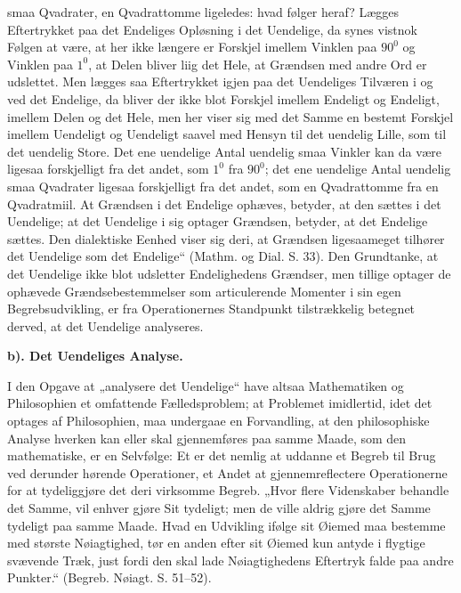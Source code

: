 \documentclass[12pt,a4paper]{book}
\begin{document}
smaa Qvadrater, en Qvadrattomme ligeledes: hvad følger
heraf? Lægges Eftertrykket paa det Endeliges Opløsning i
det Uendelige, da synes vistnok Følgen at være, at her ikke
længere er Forskjel imellem Vinklen paa $90^{0}$ og Vinklen paa
$1^{0}$, at Delen bliver liig det Hele, at Grændsen med andre
Ord er udslettet. Men lægges saa Eftertrykket igjen paa
det Uendeliges Tilværen i og ved det Endelige, da bliver
der ikke blot Forskjel imellem Endeligt og Endeligt, imellem
Delen og det Hele, men her viser sig med det Samme en
bestemt Forskjel imellem Uendeligt og Uendeligt saavel med
Hensyn til det uendelig Lille, som til det uendelig Store.
Det ene uendelige Antal uendelig smaa Vinkler kan da være
ligesaa forskjelligt fra det andet, som $1^{0}$ fra $90^{0}$; det ene
uendelige Antal uendelig smaa Qvadrater ligesaa forskjelligt
fra det andet, som en Qvadrattomme fra en Qvadratmiil.
At Grændsen i det Endelige ophæves, betyder, at den sættes
i det Uendelige; at det Uendelige i sig optager Grændsen,
betyder, at det Endelige sættes. Den dialektiske Eenhed viser
sig deri, at Grændsen ligesaameget tilhører det Uendelige som
det Endelige“ (Mathm. og Dial. S. 33). Den Grundtanke,
at det Uendelige ikke blot udsletter Endelighedens Grændser,
men tillige optager de ophævede Grændsebestemmelser som
articulerende Momenter i sin egen Begrebsudvikling, er fra
Operationernes Standpunkt tilstrækkelig betegnet derved, at
det Uendelige analyseres.

\textbf{b). Det Uendeliges Analyse.}

I den Opgave at „analysere det Uendelige“ have altsaa
Mathematiken og Philosophien et omfattende Fælledsproblem;
at Problemet imidlertid, idet det optages af Philosophien,
maa undergaae en Forvandling, at den philosophiske Analyse
hverken kan eller skal gjennemføres paa samme Maade, som
den mathematiske, er en Selvfølge: Et er det nemlig at uddanne
et Begreb til Brug ved derunder hørende Operationer,
et Andet at gjennemreflectere Operationerne for at tydeliggjøre
det deri virksomme Begreb. „Hvor flere Videnskaber
behandle det Samme, vil enhver gjøre Sit tydeligt; men de
ville aldrig gjøre det Samme tydeligt paa samme Maade.
Hvad en Udvikling ifølge sit Øiemed maa bestemme med
største Nøiagtighed, tør en anden efter sit Øiemed kun antyde
i flygtige svævende Træk, just fordi den skal lade Nøiagtighedens
Eftertryk falde paa andre Punkter.“ (Begreb. Nøiagt.
S. 51--52).
\end{document}
